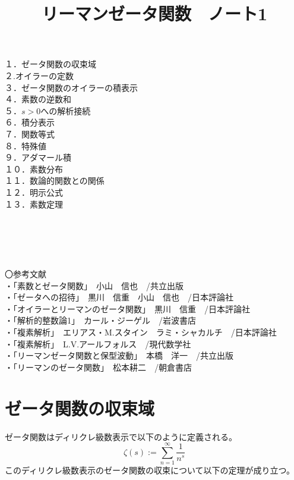 \documentclass{jsarticle}
\title{リーマンゼータ関数　ノート1}
\author{}
\date{}
\begin{document}
\maketitle
\noindent
１．ゼータ関数の収束域\\
２.オイラーの定数\\
３．ゼータ関数のオイラーの積表示\\
４．素数の逆数和\\
５．\(s>0\)への解析接続\\
６．積分表示\\
７．関数等式\\
８．特殊値\\
９．アダマール積\\
１０．素数分布\\
１１．数論的関数との関係\\
１２．明示公式\\
１３．素数定理\\
\\
\\
\\
\\
\\
〇参考文献\\
・「素数とゼータ関数」　小山　信也　/共立出版\\
・「ゼータへの招待」　黒川　信重　小山　信也　/日本評論社\\
・「オイラーとリーマンのゼータ関数」　黒川　信重　/日本評論社\\
・「解析的整数論1」　カール・ジーゲル　/岩波書店\\
・「複素解析」　エリアス・M.スタイン　ラミ・シャカルチ　/日本評論社\\
・「複素解析」　L.V.アールフォルス　/現代数学社\\
・「リーマンゼータ関数と保型波動」　本橋　洋一　/共立出版\\
・「リーマンのゼータ関数」　松本耕二　/朝倉書店
\newpage
\section{ゼータ関数の収束域}
ゼータ関数はディリクレ級数表示で以下のように定義される。
\begin{equation}
\zeta(s):=\sum_{n=1}^{\infty}\frac{1}{n^{s}}
\end{equation}
このディリクレ級数表示のゼータ関数の収束について以下の定理が成り立つ。\\
\end{document}
